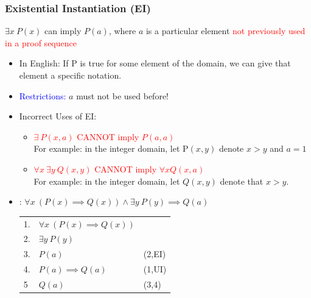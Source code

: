 \documentclass[12pt, letterpaper]{article}
\newcommand{\cul}[1]{%
		\uline{\phantom{#1}}%
		\llap{\contour{white}{#1}}%
	}
\begin{document}
\pagebreak

\subsubsection*{Existential Instantiation (EI)}
$\exists x \ P(x)$ can imply $P(a)$, where $a$ is a particular element \textcolor{red}{not previously used in a proof sequence}
\begin{itemize}[label={}, leftmargin=0.3cm]
	\item In English: If P is true for some element of the domain, we can give that element a specific notation.
	\item \textcolor{blue}{Restrictions:} $a$ must not be used before!
	\item Incorrect Uses of EI:
	\begin{itemize}
		\item \textcolor{red}{$\exists \ P(x,a)$ CANNOT imply $P(a,a)$} \\ For example: in the integer domain, let P$(x,y)$ denote $x > y$ and $a = 1$
		\item \textcolor{red}{$\forall x  \ \exists y \ Q(x,y)$ CANNOT imply $\forall x Q(x,a)$} \\ For example: in the integer domain, let $Q(x,y)$ denote that $x > y.$
	\end{itemize}
	\item \cul{Example}: $\forall x \ (P(x) \implies Q(x)) \land \exists y \ P(y) \implies Q(a)$
	\begin{center}
		\begin{tabular}{l l l}
			1. & $\forall x \ (P(x) \implies Q(x))$ & \\
			2. & $\exists y \ P(y)$ & \\
			3. & $P(a)$ & (2,EI) \\
			4. & $P(a) \implies Q(a)$ & (1,UI) \\
			5  & $Q(a)$ & (3,4)  
		\end{tabular}
	\end{center}
\end{itemize}


\pagebreak
\end{document}

